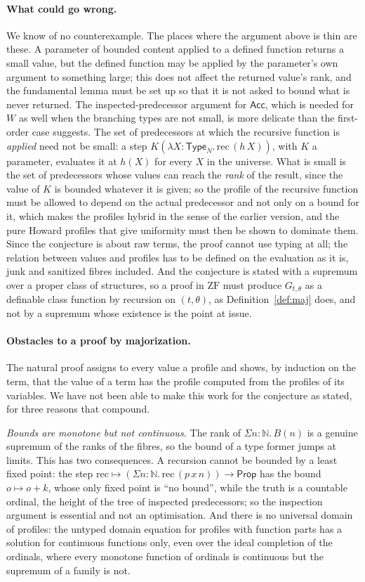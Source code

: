 \documentclass[10pt]{article}
\newcommand{\N}{\mathbb{N}}
\newcommand{\Prop}{\mathsf{Prop}}
\newcommand{\Type}{\mathsf{Type}}
\newcommand{\ZF}{\mathrm{ZF}}
\begin{document}
\paragraph{What could go wrong.}
We know of no counterexample. The places where the argument above is
thin are these. A parameter of bounded content applied to a defined
function returns a small value, but the defined function may be applied
by the parameter's own argument to something large; this does not
affect the returned value's rank, and the fundamental lemma must be set
up so that it is not asked to bound what is never returned. The
inspected-predecessor argument for $\mathsf{Acc}$, which is needed for
$W$ as well when the branching types are not small, is more delicate
than the first-order case suggests. The set of predecessors at which
the recursive function is \emph{applied} need not be small: a step
$K(\lambda X{:}\Type_N.\,\mathrm{rec}\,(h\,X))$, with $K$ a parameter,
evaluates it at $h(X)$ for every $X$ in the universe. What is small is
the set of predecessors whose values can reach the \emph{rank} of the
result, since the value of $K$ is bounded whatever it is given; so the
profile of the recursive function must be allowed to depend on the
actual predecessor and not only on a bound for it, which makes the
profiles hybrid in the sense of the earlier version, and the pure
Howard profiles that give uniformity must then be shown to dominate
them. Since the conjecture is about raw terms, the proof cannot use
typing at all; the relation between values and profiles has to be
defined on the evaluation as it is, junk and sanitized fibres
included. And the conjecture is
stated with a supremum over a proper class of structures, so a proof in
$\ZF$ must produce $G_{t,\theta}$ as a definable class function by
recursion on $(t,\theta)$, as Definition~\ref{def:maj} does, and not by
a supremum whose existence is the point at issue.

\paragraph{Obstacles to a proof by majorization.}
The natural proof assigns to every value a profile and shows, by
induction on the term, that the value of a term has the profile
computed from the profiles of its variables. We have not been able to
make this work for the conjecture as stated, for three reasons that
compound.

\emph{Bounds are monotone but not continuous.} The rank of
$\Sigma n{:}\N.\,B(n)$ is a genuine supremum of the ranks of the fibres,
so the bound of a type former jumps at limits. This has two
consequences. A recursion cannot be bounded by a least fixed point: the
step $\mathrm{rec}\mapsto(\Sigma n{:}\N.\,\mathrm{rec}\,(p\,x\,n))\to\Prop$
has the bound $o\mapsto o+k$, whose only fixed point is ``no bound'',
while the truth is a countable ordinal, the height of the tree of
inspected predecessors; so the inspection argument is essential and not
an optimisation. And there is no universal domain of profiles: the
untyped domain equation for profiles with function parts has a solution
for continuous functions only, even over the ideal completion of the
ordinals, where every monotone function of ordinals is continuous but
the supremum of a family is not.
\end{document}
